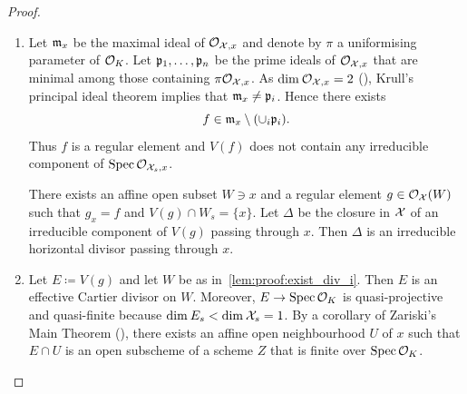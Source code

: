 \begin{proof}
    \begin{enumerate}[label=\textup{(\roman*)}]
        \item Let $\mathfrak m_x$ be the maximal ideal of $\mathcal{O}_{\mathcal X,x}$ and denote by $\pi$ a uniformising parameter of $\mathcal{O}_K$.
            Let $ \mathfrak p_1, \dots, \mathfrak p_n $ be the prime ideals of $\mathcal{O}_{\mathcal X,x}$ that are minimal among those containing $\pi \mathcal{O}_{\mathcal X,x}$.
            As $\operatorname{dim_{}}\mathcal{O}_{\mathcal X,x} = 2$ (\cite[Proposition 8.3.4]{Liu}), Krull's principal ideal theorem implies that $\mathfrak m_x \not= \mathfrak p_i$.
            Hence there exists
            \[
                f \in \mathfrak m_x \setminus (\cup_i \mathfrak p_i).
            \]
            Thus $f$ is a regular element and $V(f)$ does not contain any irreducible component of $\operatorname{Spec} \mathcal{O}_{\mathcal X_s, x}$.

            There exists an affine open subset $W \ni x$ and a regular element $g \in \mathcal{O}_\mathcal X(W)$ such that $g_x = f$
            and $V(g) \cap W_s = \{x\}$.
            Let $\Delta$ be the closure in $\mathcal X$ of an irreducible component of $V(g)$ passing through $x$.
            Then $\Delta$ is an irreducible horizontal divisor passing through $x$. \label{lem:proof:exist_div_i}
        \item Let $E \coloneqq V(g)$ and let $W$ be as in~\ref{lem:proof:exist_div_i}.
            Then $E$ is an effective Cartier divisor on $W$.
            Moreover, $E \to \operatorname{Spec} \mathcal{O}_K$ is quasi-projective and quasi-finite because $\operatorname{dim_{}}E_s < \operatorname{dim_{}}\mathcal X_s = 1$.
            By a corollary of Zariski's Main Theorem (\cite[Corollary 4.4.8]{Liu}), there exists an affine open neighbourhood
            $U$ of $x$ such that $E \cap U$ is an open subscheme of a scheme $Z$ that is finite over $\operatorname{Spec} \mathcal{O}_K$.

            \begin{center}
            \end{center}


\end{enumerate}
\end{proof}
